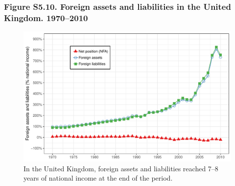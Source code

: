 \documentclass[t]{beamer}\usepackage[]{graphicx}\usepackage[]{color}
\makeatletter
\def\maxwidth{ %
  \ifdim\Gin@nat@width>\linewidth
    \linewidth
  \else
    \Gin@nat@width
  \fi
}
\newenvironment{knitrout}{}{} %
\makeatother
\begin{document}
\begin{frame}[label=Figure_S5_10]
\frametitle{Figure S5.10. Foreign assets and liabilities in the United Kingdom. 1970--2010}
\begin{figure}[t]
\begin{minipage}[b]{\textwidth}
\centering
\begin{knitrout}\footnotesize
{}\color{fgcolor}

{\centering \includegraphics[width=\maxwidth]{figures/color/Figure_S5_10} 

}



\end{knitrout}
\caption{In the United Kingdom, foreign assets and liabilities reached 7--8 years of national income at the end of the period.}
\end{minipage}
\end{figure}
\end{frame}
\end{document}
